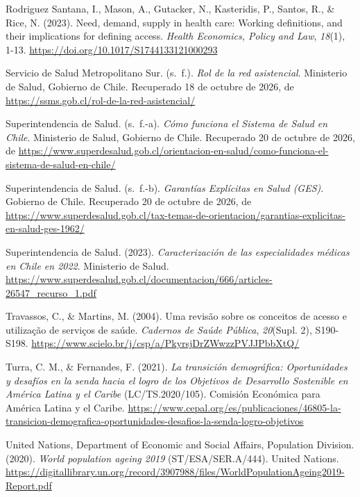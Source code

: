 \documentclass[
  spanish,
  a4paper,
  oneside]{scrbook}
\newlength{\cslhangindent}
\newenvironment{CSLReferences}[2] %
 {\begin{list}{}{%
  \setlength{\itemindent}{0pt}
  \setlength{\leftmargin}{0pt}
  \setlength{\parsep}{0pt}
  \ifodd #1
   \setlength{\leftmargin}{\cslhangindent}
   \setlength{\itemindent}{-1\cslhangindent}
  \fi
  \setlength{\itemsep}{#2\baselineskip}}}
 {\end{list}}
\begin{document}
\begin{CSLReferences}{1}{0}
Rodriguez Santana, I., Mason, A., Gutacker, N., Kasteridis, P., Santos,
R., \& Rice, N. (2023). Need, demand, supply in health care: {Working}
definitions, and their implications for defining access. \emph{Health
Economics, Policy and Law}, \emph{18}(1), 1-13.
\url{https://doi.org/10.1017/S1744133121000293}

Servicio de Salud Metropolitano Sur. (s.~f.). \emph{Rol de la red
asistencial}. Ministerio de Salud, Gobierno de Chile. Recuperado 18 de
octubre de 2026, de \url{https://ssms.gob.cl/rol-de-la-red-asistencial/}

Superintendencia de Salud. (s.~f.-a). \emph{Cómo funciona el Sistema de
Salud en Chile}. Ministerio de Salud, Gobierno de Chile. Recuperado 20
de octubre de 2026, de
\url{https://www.superdesalud.gob.cl/orientacion-en-salud/como-funciona-el-sistema-de-salud-en-chile/}

Superintendencia de Salud. (s.~f.-b). \emph{Garantías Explícitas en
Salud ({GES})}. Gobierno de Chile. Recuperado 20 de octubre de 2026, de
\url{https://www.superdesalud.gob.cl/tax-temas-de-orientacion/garantias-explicitas-en-salud-ges-1962/}

Superintendencia de Salud. (2023). \emph{Caracterización de las
especialidades médicas en Chile en 2022}. Ministerio de Salud.
\url{https://www.superdesalud.gob.cl/documentacion/666/articles-26547_recurso_1.pdf}

Travassos, C., \& Martins, M. (2004). Uma revisão sobre os conceitos de
acesso e utilização de serviços de saúde. \emph{Cadernos de Saúde
Pública}, \emph{20}(Supl. 2), S190-S198.
\url{https://www.scielo.br/j/csp/a/PkyrsjDrZWwzzPVJJPbbXtQ/}

Turra, C. M., \& Fernandes, F. (2021). \emph{La transición demográfica:
Oportunidades y desafíos en la senda hacia el logro de los Objetivos de
Desarrollo Sostenible en América Latina y el Caribe} (LC/TS.2020/105).
Comisión Económica para América Latina y el Caribe.
\url{https://www.cepal.org/es/publicaciones/46805-la-transicion-demografica-oportunidades-desafios-la-senda-logro-objetivos}

United Nations, Department of Economic and Social Affairs, Population
Division. (2020). \emph{World population ageing 2019}
(ST/ESA/SER.A/444). United Nations.
\url{https://digitallibrary.un.org/record/3907988/files/WorldPopulationAgeing2019-Report.pdf}


\end{CSLReferences}
\end{document}
